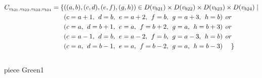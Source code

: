 \begin{align*}
C_{v_{b21},v_{b22},v_{b23},v_{b24}}=\{&((a,b),(c,d),(e,f),(g,h))\in D(v_{b21})\times D(v_{b22})\times D(v_{b23})\times D(v_{b24})\mid\\
&(c = a + 1,\hspace{1ex}d = b,\hspace{1ex}e = a + 2, \hspace{1ex}f = b,\hspace{1ex}g=a+3,\hspace{1ex}h=b)\hspace{1ex} or\\
&(c = a,\hspace{1ex}d = b+1,\hspace{1ex}e = a, \hspace{1ex}f = b+2,\hspace{1ex}g=a,\hspace{1ex}h=b+3)\hspace{1ex} or\\
&(c = a-1,\hspace{1ex}d = b,\hspace{1ex}e = a-2,\hspace{1ex} f = b,\hspace{1ex}g=a-3,\hspace{1ex}h=b)\hspace{1ex} or\\
&(c = a,\hspace{1ex}d = b-1,\hspace{1ex}e = a, \hspace{1ex}f = b-2,\hspace{1ex}g=a,\hspace{1ex}h=b-3)\hspace{3ex} \}
\end{align*}
\\ piece Green1 
